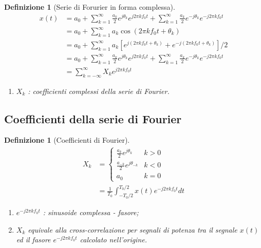 \documentclass[a4paper,10pt]{article}
\theoremstyle{mystyle}
\newtheorem{definition}[theorem]{Definizione}
\begin{document}
\begin{multicols}{2}
\begin{definition}[Serie di Forurier in forma complessa]
    \begin{align*}
        x(t)
        &= a_0 + \sum_{k=1}^{\infty} \frac{a_k}{2} e^{j \theta_k} e^{j2 \pi k f_0 t} + \sum_{k=1}^{\infty}  \frac{a_k}{2} e^{-j \theta_k} e^{-j2 \pi k f_0 t} \\
        &= a_0 + \sum_{k=1}^{\infty} a_k \cos(2\pi k f_0 t + \theta_k) \\
        &= a_0 + \sum_{k=1}^{\infty} a_k [e^{j(2\pi k f_0 t + \theta_k)}+e^{-j(2\pi k f_0 t + \theta_k)}]/2 \\
        &= a_0 + \sum_{k=1}^{\infty} \frac{a_k}{2} e^{j \theta_k} e^{j 2\pi k f_0 t} + \sum_{k=1}^{\infty} \frac{a_k}{2} e^{-j \theta_k} e^{-j 2 \pi k f_0 t} \\
        &=\sum_{k=-\infty}^{\infty}X_k e^{j2\pi k f_0 t}
    \end{align*}

    \begin{enumerate}[label=\roman*.]
        \item \(X_k\) : coefficienti complessi della serie di Fourier.
    \end{enumerate}

\end{definition}

\subsection{Coefficienti della serie di Fourier}

\begin{definition}[Coefficienti di Fourier]
    \begin{align*}
        X_k
        &=
            \begin{cases}
                \frac{a_k}{2} e^{j \theta_k} & k>0 \\
                \frac{a_{-k}}{2} e^{j \theta_{-k}} & k<0 \\
                a_0 & k=0
            \end{cases}  \\
        &= \frac{1}{T_0} \int_{-T_0/2}^{T_0/2} x(t) e^{-j2\pi k f_0 t} dt
    \end{align*}

    \begin{enumerate}[label=\roman*.]
        \item \(e^{-j 2 \pi k f_0 t}\) : sinusoide complessa - fasore;
        \item \(X_k\) equivale alla cross-correlazione per segnali di potenza tra il segnale \(x(t)\) ed il fasore \(e^{-j 2 \pi k f_0 t}\) calcolato nell'origine.
    \end{enumerate}
\end{definition}


\end{multicols}
\end{document}
